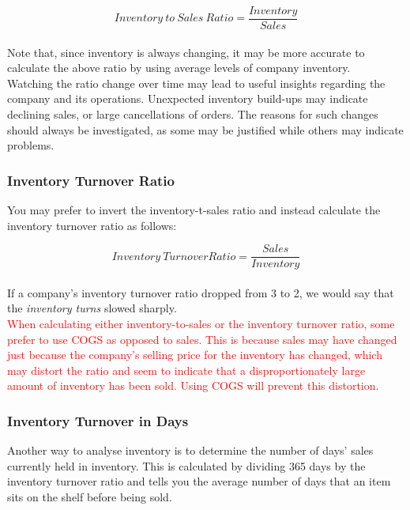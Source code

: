 \documentclass{article}
\begin{document}
\begin{equation}
    Inventory\:to\:Sales\: Ratio = \frac{Inventory}{Sales} 
\end{equation}\\

Note that, since inventory is always changing, it may be more accurate to calculate the above ratio by using average levels of company inventory. \\

Watching the ratio change over time may lead to useful insights regarding the company and its operations. Unexpected inventory build-ups may indicate declining sales, or large cancellations of orders. The reasons for such changes should always be investigated, as some may be justified while others may indicate problems. 

\subsubsection{Inventory Turnover Ratio}
You may prefer to invert the inventory-t-sales ratio and instead calculate the inventory turnover ratio as follows:

\begin{equation}
    Inventory\: Turnover Ratio = \frac{Sales}{Inventory} 
\end{equation}\\

If a company's inventory turnover ratio dropped from 3 to 2, we would say that the \textit{inventory turns} slowed sharply.\\

\textcolor{red}{When calculating either inventory-to-sales or the inventory turnover ratio, some prefer to use COGS as opposed to sales. This is because sales may have changed just because the company's selling price for the inventory has changed, which may distort the ratio and seem to indicate that a disproportionately large amount of inventory has been sold. Using COGS will prevent this distortion. }

\subsubsection{Inventory Turnover in Days}
Another way to analyse inventory is to determine the number of days' sales currently held in inventory. This is calculated by dividing 365 days by the inventory turnover ratio and tells you the average number of days that an item sits on the shelf before being sold.
\end{document}
